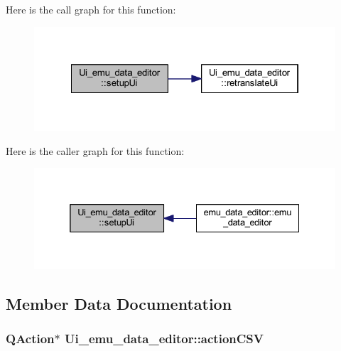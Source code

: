 Here is the call graph for this function\+:
\nopagebreak
\begin{figure}[H]
\begin{center}
\leavevmode
\includegraphics[width=322pt]{d6/d5b/a00026_a33af8ac054888d9cc0833b699028b690_cgraph}
\end{center}
\end{figure}




Here is the caller graph for this function\+:
\nopagebreak
\begin{figure}[H]
\begin{center}
\leavevmode
\includegraphics[width=332pt]{d6/d5b/a00026_a33af8ac054888d9cc0833b699028b690_icgraph}
\end{center}
\end{figure}




\subsection{Member Data Documentation}
\hypertarget{a00026_afae3d61aac77b6c20a7953b3adba9672}{
\subsubsection[{action\+C\+S\+V}]{\setlength{\rightskip}{0pt plus 5cm}Q\+Action$\ast$ Ui\+\_\+emu\+\_\+data\+\_\+editor\+::action\+C\+S\+V}}\label{a00026_afae3d61aac77b6c20a7953b3adba9672}


